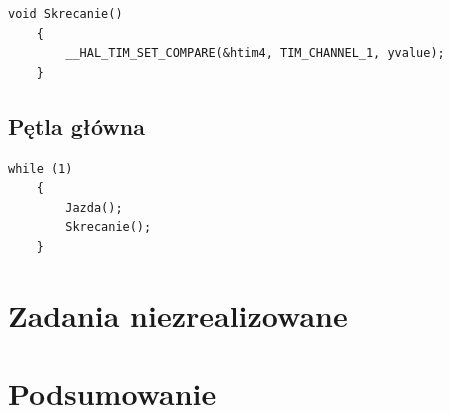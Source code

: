 \documentclass[10pt, a4paper]{article}
\begin{document}
	\begin{lstlisting}[tabsize=2]
	void Skrecanie()
	{
		__HAL_TIM_SET_COMPARE(&htim4, TIM_CHANNEL_1, yvalue);
	}
	\end{lstlisting}
	
	\subsection{Pętla główna}
	
	\begin{lstlisting}[tabsize=2]
	while (1)
	{
		Jazda();
		Skrecanie();
	}
	\end{lstlisting}

\section{Zadania niezrealizowane}


\section{Podsumowanie}



\newpage
{}


\end{document}
